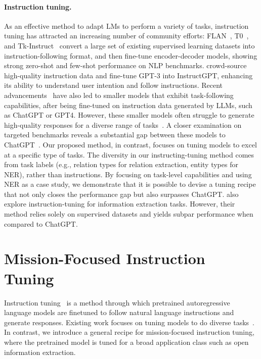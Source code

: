 \paragraph{Instruction tuning.} 
As an effective method to adapt LMs to perform a variety of tasks, instruction tuning has attracted an increasing number of community efforts: FLAN~\citep{chung2022scaling}, T0~\citep{sanh2021multitask}, and Tk-Instruct~\citep{wang-etal-2022-super} convert a large set of existing supervised learning datasets into instruction-following format, and then fine-tune encoder-decoder models, showing strong zero-shot and few-shot performance on NLP benchmarks. \citet{ouyang2022training} crowd-source high-quality instruction data and fine-tune GPT-3 into InstructGPT, enhancing its ability to understand user intention and follow instructions.
Recent advancements~\citep{alpaca,vicuna-2023,peng2023instruction} have also led to smaller models that exhibit task-following capabilities, after being fine-tuned on instruction data generated by LLMs, such as ChatGPT or GPT4.
However, these smaller models often struggle to generate high-quality responses for a diverse range of tasks~\citep{wang2023far}.
A closer examination on targeted benchmarks reveals a substantial gap between these models to ChatGPT~\citep{gudibande2023false}. 
Our proposed method, in contrast, focuses on tuning models to excel at a specific type of tasks. 
The diversity in our instructing-tuning method comes from task labels (e.g., relation types for relation extraction, entity types for NER), rather than instructions.
By focusing on task-level capabilities and using NER as a case study, we demonstrate that it is possible to devise a tuning recipe that not only closes the performance gap but also surpasses ChatGPT.
\citet{wang2023instructuie} also explore instruction-tuning for information extraction tasks. However, their method relies solely on supervised datasets and yields subpar performance when compared to ChatGPT.
\section{Mission-Focused Instruction Tuning}

Instruction tuning~\citep{ouyang2022training,wei2022finetuned} is a method through which pretrained autoregressive language models 
are finetuned to follow natural language instructions and generate responses.
Existing work focuses on tuning models to do diverse tasks~\citep{alpaca,vicuna-2023}. In contrast, we introduce a general recipe for mission-focused instruction tuning, where the pretrained model is tuned for a broad application class such as open information extraction.

